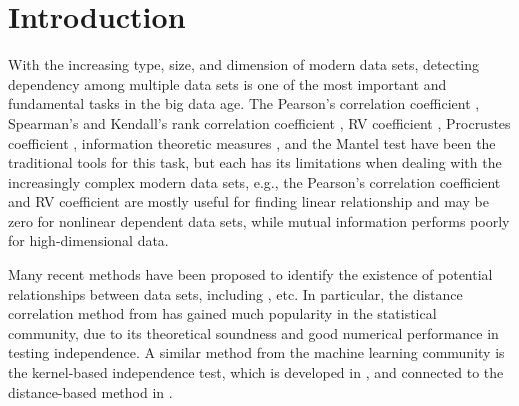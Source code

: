 \documentclass[11pt]{article}
\begin{document}
\clearpage
\tableofcontents


\newpage
{}

\section{Introduction}
\label{sec:intro}
With the increasing type, size, and dimension of modern data sets, detecting dependency among multiple data sets is one of the most important and fundamental tasks in the big data age. The Pearson's correlation coefficient \cite{Pearson1895}, Spearman's and Kendall's rank correlation coefficient \cite{KendallBook}, RV coefficient \cite{RobertEscoufier1976}, Procrustes coefficient \cite{GowerProcrustesBook}, information theoretic measures \cite{Renyi1959}, and the Mantel test \cite{Mantel1967} have been the traditional tools for this task, but each has its limitations when dealing with the increasingly complex modern data sets, e.g., the Pearson's correlation coefficient and RV coefficient are mostly useful for finding linear relationship and may be zero for nonlinear dependent data sets, while mutual information performs poorly for high-dimensional data. 

Many recent methods have been proposed to identify the existence of potential relationships between data sets, including \cite{Baringhaus2004,TaskinenOjaRandles2005, GrettonEtAl2005, SzekelyRizzoBakirov2007, GrettonGyorfi2010,Reshef2011, HellerGorfine2013, Reimherr2013, SzekelyRizzo2013a, SzekelyRizzo2013b, RizzoSzekely2016}, etc. In particular, the distance correlation method from \cite{SzekelyRizzoBakirov2007, SzekelyRizzo2009, SzekelyRizzo2013a, SzekelyRizzo2014} has gained much popularity in the statistical community, due to its theoretical soundness and good numerical performance in testing independence. A similar method from the machine learning community is the kernel-based independence test, which is developed in \cite{GrettonEtAl2005, GrettonGyorfi2010, GrettonEtAl2012}, and connected to the distance-based method in \cite{SejdinovicEtAl2013}.
\end{document}
